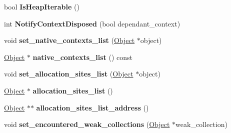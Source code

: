 \begin{DoxyCompactItemize}
\item 
bool {\bfseries Is\+Heap\+Iterable} ()\hypertarget{classv8_1_1internal_1_1_heap_a53b6f4fdb378f3a8db7eaf589235234b}{}\label{classv8_1_1internal_1_1_heap_a53b6f4fdb378f3a8db7eaf589235234b}

\item 
int {\bfseries Notify\+Context\+Disposed} (bool dependant\+\_\+context)\hypertarget{classv8_1_1internal_1_1_heap_a9c497806e47b171bd1bd3cd659ca181e}{}\label{classv8_1_1internal_1_1_heap_a9c497806e47b171bd1bd3cd659ca181e}

\item 
void {\bfseries set\+\_\+native\+\_\+contexts\+\_\+list} (\hyperlink{classv8_1_1internal_1_1_object}{Object} $\ast$object)\hypertarget{classv8_1_1internal_1_1_heap_ae04881430b202c054c546ec445d8d40e}{}\label{classv8_1_1internal_1_1_heap_ae04881430b202c054c546ec445d8d40e}

\item 
\hyperlink{classv8_1_1internal_1_1_object}{Object} $\ast$ {\bfseries native\+\_\+contexts\+\_\+list} () const \hypertarget{classv8_1_1internal_1_1_heap_aaf2cfc42933ef9004093645a97287450}{}\label{classv8_1_1internal_1_1_heap_aaf2cfc42933ef9004093645a97287450}

\item 
void {\bfseries set\+\_\+allocation\+\_\+sites\+\_\+list} (\hyperlink{classv8_1_1internal_1_1_object}{Object} $\ast$object)\hypertarget{classv8_1_1internal_1_1_heap_a7c7101ce342e3d0fb9ae41cdea3c27d7}{}\label{classv8_1_1internal_1_1_heap_a7c7101ce342e3d0fb9ae41cdea3c27d7}

\item 
\hyperlink{classv8_1_1internal_1_1_object}{Object} $\ast$ {\bfseries allocation\+\_\+sites\+\_\+list} ()\hypertarget{classv8_1_1internal_1_1_heap_a482eaa801f2ddc85a96dbe42d9591eda}{}\label{classv8_1_1internal_1_1_heap_a482eaa801f2ddc85a96dbe42d9591eda}

\item 
\hyperlink{classv8_1_1internal_1_1_object}{Object} $\ast$$\ast$ {\bfseries allocation\+\_\+sites\+\_\+list\+\_\+address} ()\hypertarget{classv8_1_1internal_1_1_heap_affd96f4a307f983cf4ce5f99d0cea66e}{}\label{classv8_1_1internal_1_1_heap_affd96f4a307f983cf4ce5f99d0cea66e}

\item 
void {\bfseries set\+\_\+encountered\+\_\+weak\+\_\+collections} (\hyperlink{classv8_1_1internal_1_1_object}{Object} $\ast$weak\+\_\+collection)\hypertarget{classv8_1_1internal_1_1_heap_aea4bd61740a10ae4746b3287c887cd7c}{}\label{classv8_1_1internal_1_1_heap_aea4bd61740a10ae4746b3287c887cd7c}


\end{DoxyCompactItemize}
